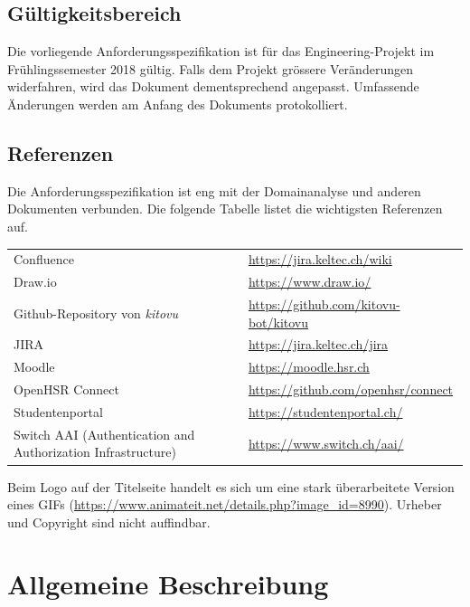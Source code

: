 \documentclass[a4paper]{article}
\let\oldsection\section
\renewcommand\section{\clearpage\oldsection}
\def\jiraurl{https://jira.keltec.ch/jira}
\def\confluenceurl{https://jira.keltec.ch/wiki}
\begin{document}
\subsection{Gültigkeitsbereich}
Die vorliegende Anforderungsspezifikation ist für das Engineering-Projekt im Frühlingssemester 2018 gültig. Falls dem Projekt grössere Veränderungen widerfahren, wird das Dokument dementsprechend angepasst. Umfassende Änderungen werden am Anfang des Dokuments protokolliert.

\subsection{Referenzen}


Die Anforderungsspezifikation ist eng mit der Domainanalyse und anderen Dokumenten verbunden. Die folgende Tabelle listet die wichtigsten Referenzen auf.

\begin{tabulary}{\linewidth}{Ll}
	Confluence & \url{\confluenceurl} \\
	Draw.io & \url{https://www.draw.io/} \\
	Github-Repository von \emph{kitovu} & \url{https://github.com/kitovu-bot/kitovu} \\
	JIRA	& \url{\jiraurl} \\
	Moodle & \url{https://moodle.hsr.ch} \\
	OpenHSR Connect & \url{https://github.com/openhsr/connect} \\
	Studentenportal & \url{https://studentenportal.ch/} \\
	Switch AAI (Authentication and Authorization Infrastructure)& \url{https://www.switch.ch/aai/} \\
	
\end{tabulary}

Beim Logo auf der Titelseite handelt es sich um eine stark überarbeitete Version eines GIFs (\url{https://www.animateit.net/details.php?image_id=8990}). Urheber und Copyright sind nicht auffindbar.

\pagebreak
\section{Allgemeine Beschreibung}
\end{document}
